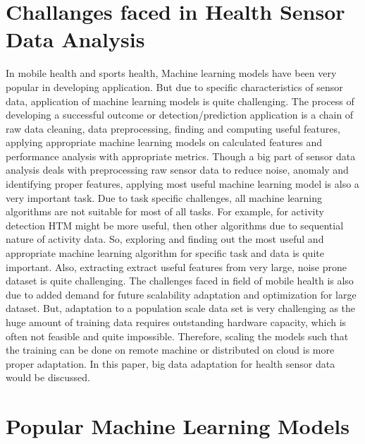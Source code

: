 \documentclass[conference]{IEEEtran}
\begin{document}
\section{Challanges faced in Health Sensor Data Analysis}
In mobile health and sports health, Machine learning models have been very popular in developing application. But due to specific characteristics of sensor data, application of machine learning models is quite challenging. The process of developing a successful outcome or detection/prediction application is a chain of raw data cleaning, data preprocessing, finding and computing useful features, applying appropriate machine learning models on calculated features and performance analysis with appropriate metrics. Though a big part of sensor data analysis deals with preprocessing raw sensor data to reduce noise, anomaly and identifying proper features, applying most useful machine learning model is also a very important task. Due to task specific challenges, all machine learning algorithms are not suitable for most of all tasks. For example, for activity detection HTM might be more useful, then other algorithms due to sequential nature of activity data. So, exploring and finding out the most useful and appropriate machine learning algorithm for specific task and data is quite important. Also, extracting extract useful features from very large, noise prone dataset is quite challenging. The challenges faced in field of mobile health is also due to added demand for future scalability adaptation and optimization for large dataset. But, adaptation to a population scale data set is very challenging as the huge amount of training data requires outstanding hardware capacity, which is often not feasible and quite impossible. Therefore, scaling the models such that the training can be done on remote machine or distributed on cloud is more proper adaptation. In this paper, big data adaptation for health sensor data would be discussed.
\section{Popular Machine Learning Models}
\end{document}
